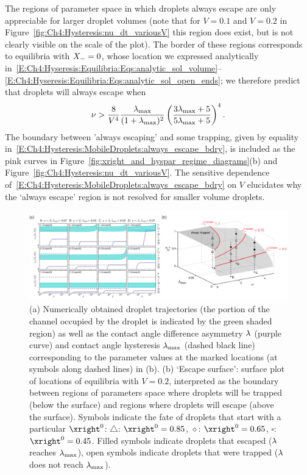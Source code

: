 The regions of parameter space in which droplets always escape are only appreciable for larger droplet volumes (note that for $V = 0.1$ and $V = 0.2$ in Figure~\ref{fig:Ch4:Hysteresis:nu_dt_variousV} this region does exist, but is not clearly visible on the scale of the plot). The border of these regions corresponds to equilibria with $X_{-} = 0$, whose location we expressed analytically in~\eqref{E:Ch4:Hyseresis:Equilibria:Eqs:analytic_sol_volume}--\eqref{E:Ch4:Hyseresis:Equilibria:Eqs:analytic_sol_open_ends}; we therefore predict that droplets will always escape when
\begin{equation}\label{E:Ch4:Hysteresis:MobileDroplets:always_escape_bdry}
\nu > \frac{8}{V^4}\frac{\lambda_{\text{max}}}{(1+\lambda_{\text{max}})^2}\left(\frac{3\lambda_{\text{max}} + 5}{5\lambda_{\text{max}} + 5}\right)^4.
\end{equation}
The boundary between 'always escaping' and some trapping, given by equality in~\eqref{E:Ch4:Hysteresis:MobileDroplets:always_escape_bdry}, is included as the pink curves in Figure~\ref{fig:xright_and_hyspar_regime_diagrams}(b) and Figure~\ref{fig:Ch4:Hysteresis:nu_dt_variousV}. The sensitive dependence of~\eqref{E:Ch4:Hysteresis:MobileDroplets:always_escape_bdry} on $V$ elucidates why the `always escape' region is not resolved for smaller volume droplets.


\begin{landscape}
\begin{figure}[t]
\centering

\includegraphics[scale = 0.22]{escape_surface_landscape}
\caption{(a)  Numerically obtained droplet trajectories (the portion of the channel occupied by the droplet is indicated by the green shaded region) as well as the contact angle difference asymmetry $\lambda$ (purple curve) and contact angle hysteresis $\lambda_{\text{max}}$ (dashed black line) corresponding to the parameter values at the marked locations (at symbols along dashed lines) in (b). (b) `Escape surface': surface plot of locations of equilibria with $V = 0.2$, interpreted as the boundary between regions of parameters space where droplets will be trapped (below the surface) and regions where droplets will escape (above the surface). Symbols indicate the fate of droplets that start with a particular $\xright^0$: $\triangle$: $\xright^0 = 0.85$, $\diamond$: $\xright^0 = 0.65$, $\square$: $\xright^0 = 0.45$. Filled symbols indicate droplets that escaped ($\lambda$ reaches $\lambda_{\text{max}}$), open symbols indicate droplets that were trapped ($\lambda$ does not reach $\lambda_{\text{max}}$).}\label{fig:Ch4:Hysteresis:escape_surface}
\end{figure}
\end{landscape}

